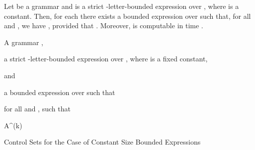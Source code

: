 \documentclass[final]{llncs}
\def\df#1{\scriptscriptstyle\mathbf{df}(#1)}
\begin{document}
\begin{lemma}\label{lem:ginsbook-d}
  Let  be a grammar
  and  is a strict -letter-bounded
  expression over , where  is a constant.
  Then, for each  there exists a bounded expression 
  over  such that, for all  and
  , we have , provided
  that . Moreover, 
  is computable in time .
\end{lemma}

\begin{algorithm}[thb]
{\scriptsize
\begin{algorithmic}[0]
 A grammar , 

       \State \hspace*{7mm} a strict -letter-bounded expression  
       over , where  is a fixed constant,

       \State \hspace*{7mm} and 

   a bounded expression  over  such that
  
	for all  and , such that
	
\end{algorithmic}
\begin{algorithmic}[1]

	\State  \label{ln:h-start}

        \State 

	\State A^{\df{k}}
        \label{ln:h-trans}

        \State \label{ln:h-end}

        \State 

        \State 
        \label{ln:dijkstra}

  \For{}\label{ln:b0-start}

	\State 
        \label{ln:cq}

	\State 
        \label{ln:concat-cq}

  \EndFor\label{ln:b0-end}

  \State  
  \label{ln:c-start}

  \For{}
           \State 
           \label{ln:concat-prod}
  \EndFor\label{ln:c-end}

  \State  

  \For{}\label{ln:pat-start}
  \State 
  \EndFor\label{ln:pat-end}

  \State 
  \EndFunction
\end{algorithmic}
\caption{Control Sets for the Case of Constant Size Bounded Expressions}\label{alg:constant-control-set}
}
\end{algorithm}
\end{document}
